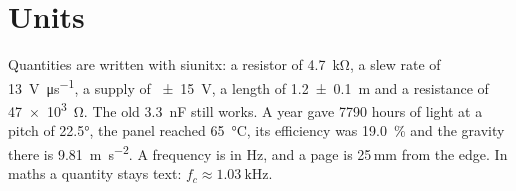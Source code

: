 \section{Units}\label{sec:units}

Quantities are written with siunitx: a resistor of \qty{4.7}{\kilo\ohm}, a slew rate of
\qty{13}{\volt\per\micro\second}, a supply of \qty{\pm 15}{\volt}, a length of
\qty{1.2 \pm 0.1}{\metre} and a resistance of \qty{47e3}{\ohm}. The old \SI{3.3}{\nano\farad}
still works. A year gave \num{7790} hours of light at a pitch of \ang{22.5}, the panel
reached \qty{65}{\degreeCelsius}, its efficiency was \qty{19.0}{\percent} and the gravity
there is \qty{9.81}{\metre\per\second\squared}. A frequency is in \unit{\hertz}, and a page
is 25\,mm from the edge. In maths a quantity stays text:
$f_c \approx \qty{1.03}{\kilo\hertz}$.
